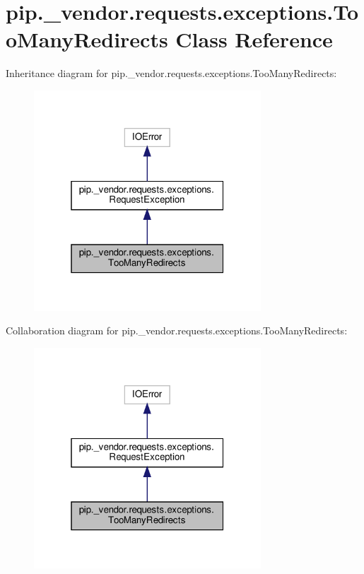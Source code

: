 \hypertarget{classpip_1_1__vendor_1_1requests_1_1exceptions_1_1TooManyRedirects}{}\section{pip.\+\_\+vendor.\+requests.\+exceptions.\+Too\+Many\+Redirects Class Reference}
\label{classpip_1_1__vendor_1_1requests_1_1exceptions_1_1TooManyRedirects}


Inheritance diagram for pip.\+\_\+vendor.\+requests.\+exceptions.\+Too\+Many\+Redirects\+:
\nopagebreak
\begin{figure}[H]
\begin{center}
\leavevmode
\includegraphics[width=241pt]{classpip_1_1__vendor_1_1requests_1_1exceptions_1_1TooManyRedirects__inherit__graph}
\end{center}
\end{figure}


Collaboration diagram for pip.\+\_\+vendor.\+requests.\+exceptions.\+Too\+Many\+Redirects\+:
\nopagebreak
\begin{figure}[H]
\begin{center}
\leavevmode
\includegraphics[width=241pt]{classpip_1_1__vendor_1_1requests_1_1exceptions_1_1TooManyRedirects__coll__graph}
\end{center}
\end{figure}
